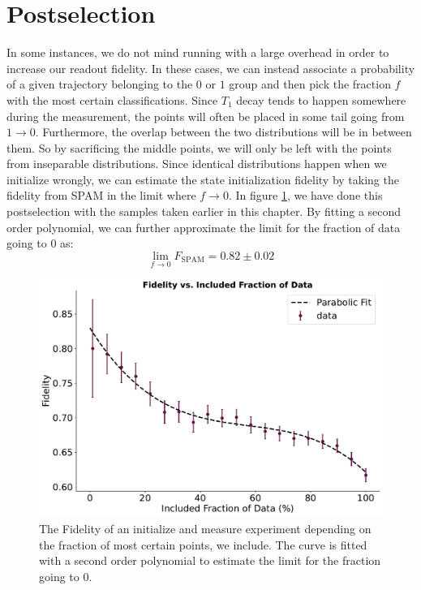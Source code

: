 \section{Postselection}
In some instances, we do not mind running with a large overhead in order to increase our readout fidelity. In these cases, we can instead associate a probability of a given trajectory belonging to the $0$ or $1$ group and then pick the fraction $f$ with the most certain classifications. Since $T_1$ decay tends to happen somewhere during the measurement, the points will often be placed in some tail going from $1 \to 0$. Furthermore, the overlap between the two distributions will be in between them. So by sacrificing the middle points, we will only be left with the points from inseparable distributions. Since identical distributions happen when we initialize wrongly, we can estimate the state initialization fidelity by taking the fidelity from SPAM in the limit where $f\to 0$. In figure \ref{fig:postselection_plot}, we have done this postselection with the samples taken earlier in this chapter. By fitting a second order polynomial, we can further approximate the limit for the fraction of data going to 0 as:
\begin{equation}
    \lim_{f \to 0} F_{\text{SPAM}} = 0.82 \pm 0.02
\end{equation}

\begin{figure}[t]
    \centering
    \includegraphics[]{Readout/Figs/fidelity_vs_included_fraction.pdf}
    \caption{The Fidelity of an initialize and measure experiment depending on the fraction of most certain points, we include. The curve is fitted with a second order polynomial to estimate the limit for the fraction going to $0$.}
    \label{fig:postselection_plot}
\end{figure}

